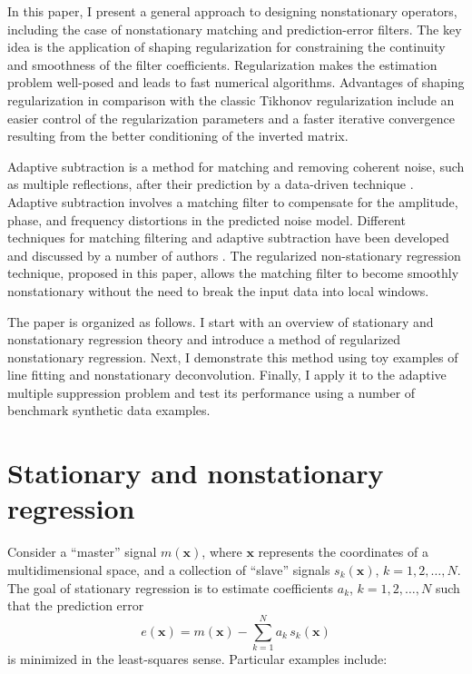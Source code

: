 In this paper, I present a general approach to designing nonstationary
operators, including the case of nonstationary matching and
prediction-error filters. The key idea is the application of shaping
regularization \cite[]{shape} for constraining the continuity and
smoothness of the filter coefficients. Regularization makes the
estimation problem well-posed and leads to fast numerical
algorithms. Advantages of shaping regularization in comparison with
the classic Tikhonov regularization include an easier control of the
regularization parameters and a faster iterative convergence resulting
from the better conditioning of the inverted matrix.

Adaptive subtraction is a method for matching and removing coherent
noise, such as multiple reflections, after their prediction by a
data-driven technique \cite[]{GEO57-09-11661177}. Adaptive subtraction
involves a matching filter to compensate for the amplitude, phase, and
frequency distortions in the predicted noise model. Different
techniques for matching filtering and adaptive subtraction have been developed and discussed by a number of authors
\cite[]{GEO57-09-11661177,GPR41-06-07250736,TLE18-01-00550058,TLE22-04-03400343,GEO68-01-03460354,GPR52-01-00270038,TLE24-03-02820284,TLE24-03-02770280,denisov}. The
regularized non-stationary regression technique, proposed in this
paper, allows the matching filter to become smoothly nonstationary
without the need to break the input data into local windows.

The paper is organized as follows. I start with an overview of
stationary and nonstationary regression theory and introduce a method
of regularized nonstationary regression. Next, I demonstrate this
method using toy examples of line fitting and nonstationary
deconvolution. Finally, I apply it to the adaptive multiple
suppression problem and test its performance using a number of
benchmark synthetic data examples.

\section{Stationary and nonstationary regression}
Consider a ``master'' signal $m(\mathbf{x})$, where $\mathbf{x}$
represents the coordinates of a multidimensional space, and a
collection of ``slave'' signals $s_k(\mathbf{x})$, $k=1,2,\ldots,N$.
The goal of stationary regression is to estimate coefficients $a_k$,
$k=1,2,\ldots,N$ such that the prediction error
\begin{equation}
  \label{eq:pred}
  e(\mathbf{x}) = m(\mathbf{x}) - \displaystyle \sum_{k=1}^{N} a_k\,s_k(\mathbf{x})
\end{equation}
is minimized in the least-squares sense. Particular examples include:

